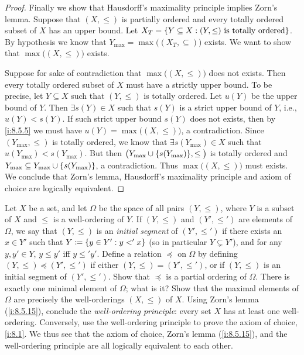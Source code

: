 \begin{proof}
  Finally we show that Hausdorff's maximality principle implies Zorn's lemma.
  Suppose that \((X, \leq)\) is partially ordered and every totally ordered subset of \(X\) has an upper bound.
  Let \(X_T = \left\lbrace Y \subseteq X : (Y, \leq) \text{ is totally ordered}\right\rbrace\).
  By hypothesis we know that \(Y_{\max} = \max\big((X_T, \subseteq)\big)\) exists.
  We want to show that \(\max\big((X, \leq)\big)\) exists.

  Suppose for sake of contradiction that \(\max\big((X, \leq)\big)\) does not exists.
  Then every totally ordered subset of \(X\) must have a strictly upper bound.
  To be precise, let \(Y \subseteq X\) such that \((Y, \leq)\) is totally ordered.
  Let \(u(Y)\) be the upper bound of \(Y\).
  Then \(\exists s(Y) \in X\) such that \(s(Y)\) is a strict upper bound of \(Y\), i.e., \(u(Y) < s(Y)\).
  If such strict upper bound \(s(Y)\) does not exists, then by \cref{i:8.5.5} we must have \(u(Y) = \max\big((X, \leq)\big)\), a contradiction.
  Since \((Y_{\max}, \leq)\) is totally ordered, we know that \(\exists s(Y_{\max}) \in X\) such that \(u(Y_{\max}) < s(Y_{\max})\).
  But then \(\big(Y_{\max} \cup \set{s(Y_{\max})}, \leq\big)\) is totally ordered and \(Y_{\max} \subseteq Y_{\max} \cup \left\lbrace s(Y_{\max})\right\rbrace\), a contradiction.
  Thus \(\max\big((X, \leq)\big)\) must exists.
  We conclude that Zorn's lemma, Hausdorff's maximality principle and axiom of choice are logically equivalent.
\end{proof}

\begin{ex}\label{i:ex:8.5.19}
  Let \(X\) be a set, and let \(\Omega\) be the space of all pairs \((Y, \leq)\), where \(Y\) is a subset of \(X\) and \(\leq\) is a well-ordering of \(Y\).
  If \((Y, \leq)\) and \((Y', \leq')\) are elements of \(\Omega\), we say that \((Y, \leq)\) is an \emph{initial segment} of \((Y', \leq')\) if there exists an \(x \in Y'\) such that \(Y \coloneqq \left\lbrace y \in Y' : y <' x\right\rbrace\) (so in particular \(Y \subsetneq Y'\)), and for any \(y, y' \in Y\), \(y \leq y'\) iff \(y \leq' y'\).
  Define a relation \(\preceq\) on \(\Omega\) by defining \((Y, \leq) \preceq (Y', \leq')\) if either \((Y, \leq) = (Y', \leq')\), or if \((Y, \leq)\) is an initial segment of \((Y', \leq')\).
  Show that \(\preceq\) is a partial ordering of \(\Omega\).
  There is exactly one minimal element of \(\Omega\);
  what is it?
  Show that the maximal elements of \(\Omega\) are precisely the well-orderings \((X, \leq)\) of \(X\).
  Using Zorn's lemma (\cref{i:8.5.15}), conclude the \emph{well-ordering principle}:
  every set \(X\) has at least one well-ordering.
  Conversely, use the well-ordering principle to prove the axiom of choice, \cref{i:8.1}.
  We thus see that the axiom of choice, Zorn's lemma (\cref{i:8.5.15}), and the well-ordering principle are all logically equivalent to each other.
\end{ex}

